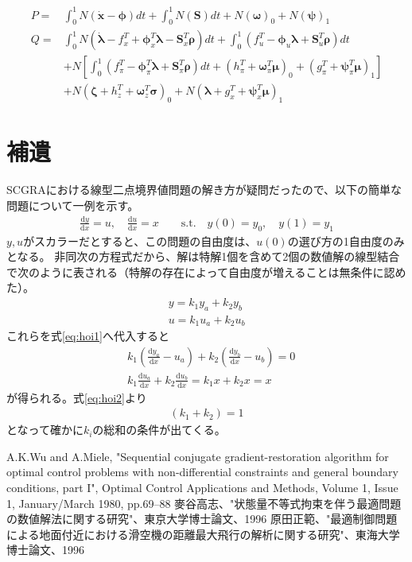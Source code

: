 \documentclass[a4paper]{bxjsarticle}
\newcommand*{\diff}[2]
{
	\frac{\mathrm{d}#1}{\mathrm{d}#2}
}
\begin{document}
		\begin{align}
		P = &\int_{0}^{1} N(\dot{\bm{x}}- \bm{\phi})dt + \int_{0}^{1} N(\bm{S}) dt + N(\bm{\omega})_0  + N(\bm{\psi})_1 \\		
		Q = &\int_{0}^{1} N(\dot{\bm{\lambda}} - f_x^T + \bm{\phi}^T_x \bm{\lambda}  - \bm{S}_x^T \bm{\rho} )dt + \int_{0}^{1}(f_u^T - \bm{\phi}_u \bm{\lambda + \bm{S}}_u^T \bm{\rho} ) dt \nonumber \\
		&+N\left[\int_{0}^{1}(f_{\pi}^T - \bm{\phi}_\pi^T \bm{\lambda}+\bm{S}^T_{\pi}\bm{\rho})dt + (h_{\pi}^T+\bm{\omega}^T_{\pi}\bm{\mu})_0 + (g_{\pi}^T+\bm{\psi}^T_{\pi}\bm{\mu})_1\right] \nonumber \\
		&+ N(\bm{\zeta} + h_z^T + \bm{\omega}_z^T \bm{\sigma})_0 + N(\bm{\lambda} + g_x^T + \bm{\psi}_x^T \bm{\mu})_1
		\end{align}
	\section{補遺}
	SCGRAにおける線型二点境界値問題の解き方が疑問だったので、以下の簡単な問題について一例を示す。
	\begin{align}
		\diff{y}{x} = u,\quad
		\diff{u}{x} = x\qquad
		\text{s.t.} \quad y(0) = y_0, \quad y(1) = y_1 \label{eq:hoi1}
	\end{align}
	$y,u$がスカラーだとすると、この問題の自由度は、$u(0)$の選び方の1自由度のみとなる。
	非同次の方程式だから、解は特解1個を含めて2個の数値解の線型結合で次のように表される（特解の存在によって自由度が増えることは無条件に認めた）。
	\begin{align}
		y = k_1 y_a + k_2 y_b\\
		u = k_1 u_a + k_2 u_b
	\end{align}
	これらを式\eqref{eq:hoi1}へ代入すると
	\begin{align}
	&k_1 \left(\diff{y_a}{x} -u_a \right) + k_2 \left(\diff{y_b}{x} -u_b\right)= 0 \\
	&k_1 \diff{u_a}{x} + k_2 \diff{u_b}{x}= k_1 x + k_2 x  = x \label{eq:hoi2}
	\end{align}
	が得られる。式\eqref{eq:hoi2}より
	\begin{align}
	(k_1+k_2) = 1
	\end{align}
	となって確かに$k_i$の総和の条件が出てくる。
	\begin{thebibliography}{9}
		 A.K.Wu and A.Miele, "Sequential conjugate gradient-restoration algorithm for optimal control problems with non-differential constraints and general boundary conditions, part I", Optimal Control Applications and Methods, Volume 1, Issue 1, January/March 1980, pp.69--88
		 麥谷高志、"状態量不等式拘束を伴う最適問題の数値解法に関する研究"、東京大学博士論文、1996			
		 原田正範、"最適制御問題による地面付近における滑空機の距離最大飛行の解析に関する研究"、東海大学博士論文、1996

	\end{thebibliography}
\end{document}
